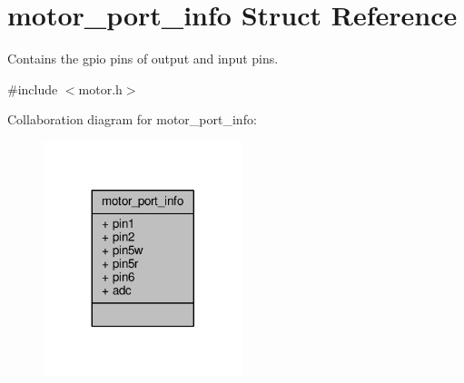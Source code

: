\hypertarget{structmotor__port__info}{}\section{motor\+\_\+port\+\_\+info Struct Reference}
\label{structmotor__port__info}


Contains the gpio pins of output and input pins.  




{\ttfamily \#include $<$motor.\+h$>$}



Collaboration diagram for motor\+\_\+port\+\_\+info\+:\nopagebreak
\begin{figure}[H]
\begin{center}
\leavevmode
\includegraphics[width=164pt]{structmotor__port__info__coll__graph}
\end{center}
\end{figure}

